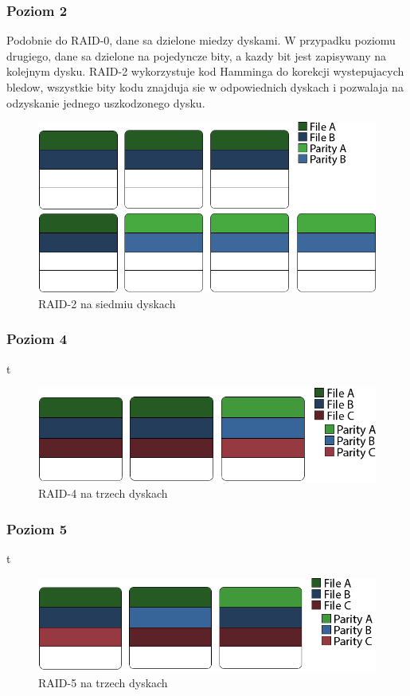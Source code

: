 \subsubsection{Poziom 2}
Podobnie do RAID-0, dane sa dzielone miedzy dyskami. W przypadku poziomu drugiego, dane sa dzielone na pojedyncze bity, a kazdy bit jest zapisywany na kolejnym dysku. RAID-2 wykorzystuje kod Hamminga do korekcji wystepujacych bledow, wszystkie bity kodu znajduja sie w odpowiednich dyskach i  pozwalaja na odzyskanie jednego uszkodzonego dysku. 
\begin{figure}[h!]
        \centering
        \includegraphics{raid-2.png}
        \caption{RAID-2 na siedmiu dyskach}
        \label{fig:raid2}
\end{figure}
\subsubsection{Poziom 4}
t
\begin{figure}[h!]
        \centering
        \includegraphics{raid-4.png}
        \caption{RAID-4 na trzech dyskach}
        \label{fig:raid4}
\end{figure}
\subsubsection{Poziom 5}
t
\begin{figure}[h!]
        \centering
        \includegraphics{raid-5.png}
        \caption{RAID-5 na trzech dyskach}
        \label{fig:raid5}
\end{figure}
